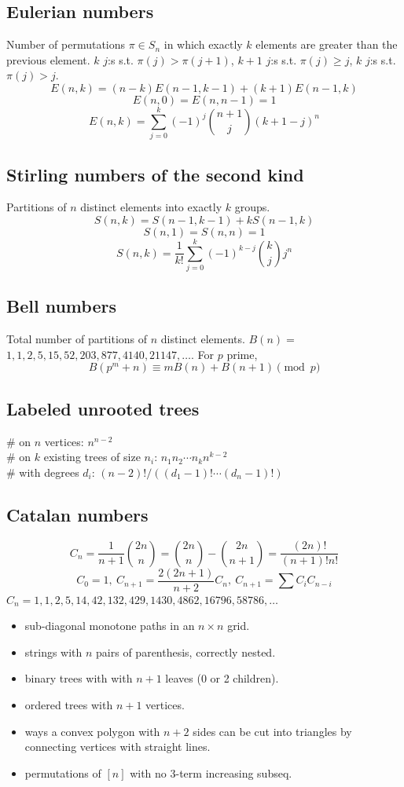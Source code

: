 	\subsection{Eulerian numbers}
		Number of permutations $\pi \in S_n$ in which exactly $k$ elements are greater than the previous element. $k$ $j$:s s.t. $\pi(j)>\pi(j+1)$, $k+1$ $j$:s s.t. $\pi(j)\geq j$, $k$ $j$:s s.t. $\pi(j)>j$.
		$$E(n,k) = (n-k)E(n-1,k-1) + (k+1)E(n-1,k)$$
		$$E(n,0) = E(n,n-1) = 1$$
		$$E(n,k) = \sum_{j=0}^k(-1)^j\binom{n+1}{j}(k+1-j)^n$$

	\subsection{Stirling numbers of the second kind}
		Partitions of $n$ distinct elements into exactly $k$ groups.
		$$S(n,k) = S(n-1,k-1) + k S(n-1,k)$$
		$$S(n,1) = S(n,n) = 1$$
		$$S(n,k) = \frac{1}{k!}\sum_{j=0}^k (-1)^{k-j}\binom{k}{j}j^n$$

	\subsection{Bell numbers}
		Total number of partitions of $n$ distinct elements. $B(n) =$
		$1, 1, 2, 5, 15, 52, 203, 877, 4140, 21147, \dots$. For $p$ prime,
		\[ B(p^m+n)\equiv mB(n)+B(n+1) \pmod{p} \]

	\subsection{Labeled unrooted trees}
		\# on $n$ vertices: $n^{n-2}$ \\
		\# on $k$ existing trees of size $n_i$: $n_1n_2\cdots n_k n^{k-2}$ \\
		\# with degrees $d_i$: $(n-2)! / ((d_1-1)! \cdots (d_n-1)!)$ \newline

	\subsection{Catalan numbers}
		\[ C_n=\frac{1}{n+1}\binom{2n}{n}= \binom{2n}{n}-\binom{2n}{n+1} = \frac{(2n)!}{(n+1)!n!} \]
		\[ C_0=1,\ C_{n+1} = \frac{2(2n+1)}{n+2}C_n,\ C_{n+1}=\sum C_iC_{n-i} \]
		${C_n = 1, 1, 2, 5, 14, 42, 132, 429, 1430, 4862, 16796, 58786, \dots}$
		\begin{itemize}[noitemsep]
			\item sub-diagonal monotone paths in an $n\times n$ grid.
			\item strings with $n$ pairs of parenthesis, correctly nested.
			\item binary trees with with $n+1$ leaves (0 or 2 children).
			\item ordered trees with $n+1$ vertices.
			\item ways a convex polygon with $n+2$ sides can be cut into triangles by connecting vertices with straight lines.
			\item permutations of $[n]$ with no 3-term increasing subseq.
		\end{itemize}
